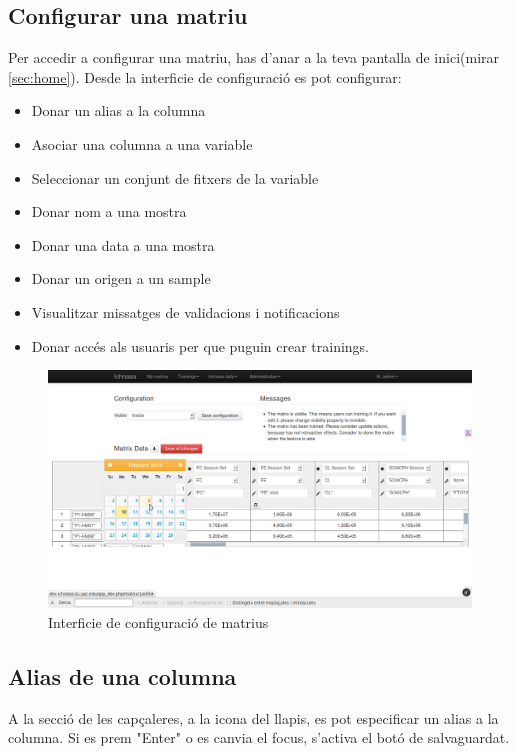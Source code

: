 \begin{itemize}
\section{Configurar una matriu}
\label{sec:configure_matrix}
Per accedir a configurar una matriu, has d'anar a la teva pantalla de inici(mirar \ref{sec:home}). 
Desde la interficie de configuraci\'{o} es pot configurar:
\begin{itemize}
\item Donar un alias a la columna
\item Asociar una columna a una variable
\item Seleccionar un conjunt de fitxers de la variable
\item Donar nom a una mostra
\item Donar una data a una mostra
\item Donar un origen a un sample
\item Visualitzar missatges de validacions i notificacions
\item Donar acc\'{e}s als usuaris per que puguin crear trainings.
\end{itemize}
\begin{figure}[h!]
  \centering
  \includegraphics[scale=0.2]{img/userguide/matrix_configure.png}
  \caption{Interficie de configuraci\'{o} de matrius}
  \label{fig:configure_matrix}
\end{figure}

\subsection{Alias de una columna} 
A la secci\'{o} de les capçaleres, a la icona del llapis, es pot especificar un alias a la columna. Si es prem "Enter" o es canvia el focus, s'activa el bot\'{o} de salvaguardat.


\end{itemize}

